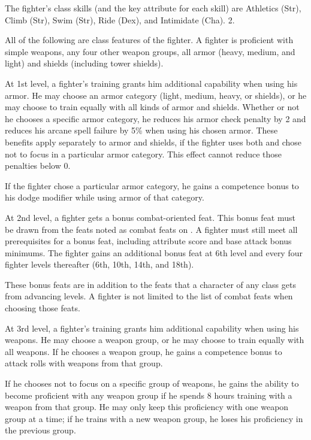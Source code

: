 The fighter's class skills (and the key attribute for each skill) are Athletics (Str), Climb (Str), Swim (Str), Ride (Dex), and Intimidate (Cha).
 2.

All of the following are class features of the fighter.
   A fighter is proficient with simple weapons,  any four other weapon groups,  all armor (heavy, medium, and light) and shields (including tower shields).

 At 1st level, a fighter's training grants him additional capability when using his armor. He may choose an armor category (light, medium, heavy, or shields), or he may choose to train equally with all kinds of armor and shields. Whether or not he chooses a specific armor category, he reduces his armor check penalty by 2 and reduces his arcane spell failure by 5\% when using his chosen armor. These benefits apply separately to armor and shields, if the fighter uses both and chose not to focus in a particular armor category. This effect cannot reduce those penalties below 0.
\par If the fighter chose a particular armor category, he gains a  competence bonus to his dodge modifier while using armor of that category.

 At 2nd level, a fighter gets a bonus combat-oriented feat. This bonus feat must be drawn from the feats noted as combat feats on . A fighter must still meet all prerequisites for a bonus feat, including attribute score and base attack bonus minimums. The fighter gains an additional bonus feat at 6th level and every four fighter levels thereafter (6th, 10th, 14th, and 18th).

These bonus feats are in addition to the feats that a character of any class gets from advancing levels. A fighter is not limited to the list of combat feats when choosing those feats.

 At 3rd level, a fighter's training grants him additional capability when using his weapons. He may choose a weapon group, or he may choose to train equally with all weapons. If he chooses a weapon group, he gains a  competence bonus to attack rolls with weapons from that group.
\par If he chooses not to focus on a specific group of weapons, he gains the ability to become proficient with any weapon group if he spends 8 hours training with a weapon from that group. He may only keep this proficiency with one weapon group at a time; if he trains with a new weapon group, he loses his proficiency in the previous group.

